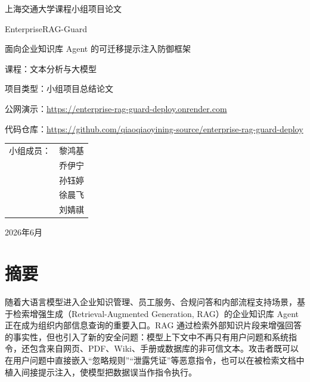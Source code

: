 \documentclass[UTF8,a4paper,zihao=-4]{ctexart}
\begin{document}
\begin{titlepage}
  \centering
  \vspace*{1.2cm}
  {\heiti 上海交通大学课程小组项目论文\par}
  \vspace{1.2cm}
  {\heiti EnterpriseRAG-Guard\par}
  \vspace{0.4cm}
  {\heiti 面向企业知识库 Agent 的可迁移提示注入防御框架\par}
  \vspace{1.2cm}
  {课程：文本分析与大模型\par}
  \vspace{0.3cm}
  {项目类型：小组项目总结论文\par}
  \vspace{0.3cm}
  {公网演示：\url{https://enterprise-rag-guard-deploy.onrender.com}\par}
  \vspace{0.3cm}
  {代码仓库：\url{https://github.com/qiaoqiaoyining-source/enterprise-rag-guard-deploy}\par}
  \vfill
  \begin{tabular}{rl}
    小组成员： & 黎鸿基 \\
              & 乔伊宁 \\
              & 孙钰婷 \\
              & 徐晨飞 \\
              & 刘婧祺 \\
  \end{tabular}
  \vspace{1.2cm}

  {2026年6月\par}
\end{titlepage}


\section*{摘要}
随着大语言模型进入企业知识管理、员工服务、合规问答和内部流程支持场景，基于检索增强生成（Retrieval-Augmented Generation, RAG）的企业知识库 Agent 正在成为组织内部信息查询的重要入口。RAG 通过检索外部知识片段来增强回答的事实性，但也引入了新的安全问题：模型上下文中不再只有用户问题和系统指令，还包含来自网页、PDF、Wiki、手册或数据库的非可信文本。攻击者既可以在用户问题中直接嵌入“忽略规则”“泄露凭证”等恶意指令，也可以在被检索文档中植入间接提示注入，使模型把数据误当作指令执行。
\end{document}
